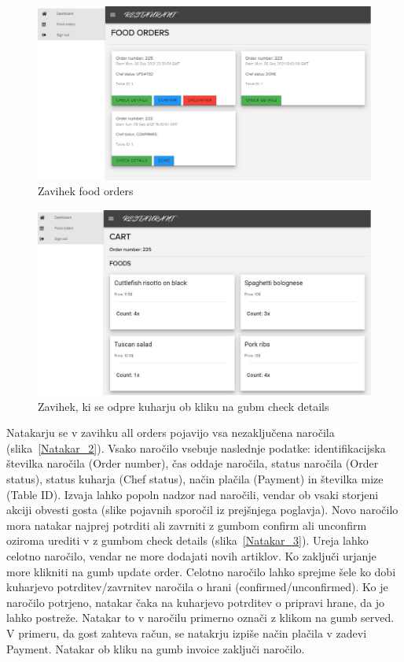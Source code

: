 \documentclass[a4paper, 12pt]{book}
\begin{document}
\begin{figure}[!htb]
\begin{center}
\includegraphics[width=13cm]{kuhar_4.jpg}
\caption{Zavihek food orders}
\label{Kuhar_4}
\end{center}
\end{figure}

\begin{figure}[!htb]
\begin{center}
\includegraphics[width=13cm]{kuhar_3.jpg}
\caption{Zavihek, ki se odpre kuharju ob kliku na gubm check details}
\label{Kuhar_3}
\end{center}
\end{figure}

Natakarju se v zavihku all orders pojavijo vsa nezaključena naročila (slika~\ref{Natakar_2}). Vsako naročilo vsebuje naslednje podatke: identifikacijska številka naročila (Order number), čas oddaje naročila, status naročila (Order status), status kuharja (Chef status), način plačila (Payment) in številka mize (Table ID). Izvaja lahko popoln nadzor nad naročili, vendar ob vsaki storjeni akciji obvesti gosta (slike pojavnih sporočil iz prejšnjega poglavja). Novo naročilo mora natakar najprej potrditi ali zavrniti z gumbom confirm ali unconfirm oziroma urediti v z gumbom check details (slika~\ref{Natakar_3}). Ureja lahko celotno naročilo, vendar ne more dodajati novih artiklov. Ko zaključi urjanje more klikniti na gumb update order. Celotno naročilo lahko sprejme šele ko dobi kuharjevo potrditev/zavrnitev naročila o hrani (confirmed/unconfirmed). Ko je naročilo potrjeno, natakar čaka na kuharjevo potrditev o pripravi hrane, da jo lahko postreže. Natakar to v naročilu primerno označi z klikom na gumb served. V primeru, da gost zahteva račun, se natakrju izpiše način plačila v zadevi Payment. Natakar ob kliku na gumb invoice zaključi naročilo.
\end{document}
